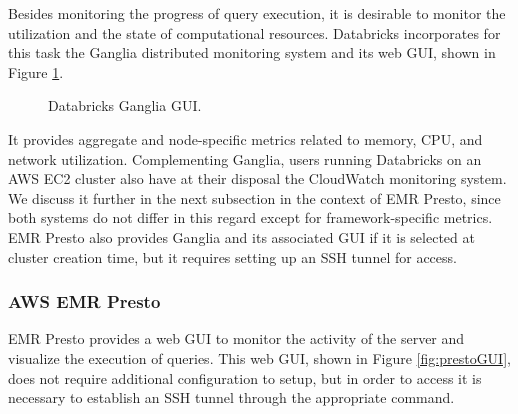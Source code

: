 Besides monitoring the progress of query execution, it is desirable to monitor the utilization and the state of computational resources. Databricks incorporates for this task the Ganglia distributed monitoring system and its web GUI, shown in Figure \ref{fig:databricksGanglia}.

\begin{figure}
   \begin{center}
   \end{center}
   \caption{Databricks Ganglia GUI.}
   \label{fig:databricksGanglia}
\end{figure}

It provides aggregate and node-specific metrics related to memory, CPU, and network utilization. Complementing Ganglia, users running Databricks on an AWS EC2 cluster also have at their disposal the CloudWatch monitoring system. We discuss it further in the next subsection in the context of EMR Presto, since both systems do not differ in this regard except for framework-specific metrics. EMR Presto also provides Ganglia and its associated GUI if it is selected at cluster creation time, but it requires setting up an SSH tunnel for access.

\subsubsection{AWS EMR Presto}

EMR Presto provides a web GUI to monitor the activity of the server and visualize the execution of queries. This web GUI, shown in Figure \ref{fig:prestoGUI}, does not require additional configuration to setup, but in order to access it is necessary to establish an SSH tunnel through the appropriate command.

